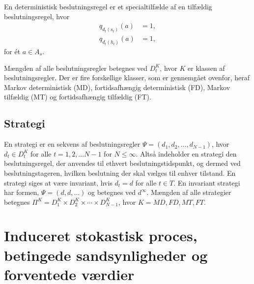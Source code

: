 En deterministisk beslutningsregel er et specialtilfælde af en tilfældig beslutningsregel, hvor 
\begin{align*}
    q_{d_t(s_t)}(a)&=1, \\
    q_{d_t(h_t)}(a)&=1, 
\end{align*}
for ét $a\in A_s$. 

Mængden af alle beslutningsregler betegnes ved $D_t^K$, hvor $K$ er klassen af beslutningsregler. Der er fire forskellige klasser, som er gennemgået ovenfor, heraf Markov deterministisk (MD), fortidsafhængig deterministisk (FD), Markov tilfældig (MT) og fortidsafhængig tilfældig (FT). 

\subsection{Strategi}
En strategi er en sekvens af beslutningsregler $\Psi=(d_1,d_2,\dots,d_{N-1})$, hvor $d_t\in D_t^K$ for alle $t=1, 2, \dots N-1$ for $N \leq \infty$. Altså indeholder en strategi den beslutningsregel, der anvendes til ethvert beslutningstidspunkt, og dermed ved beslutningstageren, hvilken beslutning der skal vælges til enhver tilstand. En strategi siges at være invariant, hvis $d_t=d$ for alle $t\in T$. En invariant strategi har formen, $\Psi=(d,d,\dots)$ og betegnes ved $d^\infty$. 
Mængden af alle strategier betegnes $\Pi^K=D_1^K\times D_2^K\times \cdots\times D_{N-1}^K$, hvor $K=MD, FD, MT, FT$.



\section{Induceret stokastisk proces, betingede sandsynligheder og forventede værdier}



